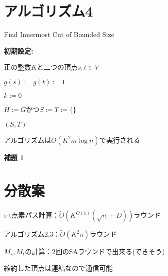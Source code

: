 \documentclass{jarticle}
\theoremstyle{definition}
\newtheorem{lemma}{補題}
\begin{document}
\section*{アルゴリズム4}

\begin{algorithm}[H]
    \caption{Find Innermost Cut of Bounded Size}
    \textbf{初期設定:} \par
    正の整数$K$と二つの頂点$s,t\in V$ \par
    $g(s):= g(t) := 1$ \par
    $k:=0$ \par
    $H:=G$かつ$S:=T:=\{\}$ \par
    {\setlength{\baselineskip}{10pt}
    \begin{algorithmic}[1]
         
         
         
        \Else 
        \EndIf

        \Else 
        \EndIf

        \Else 
             
             
        \EndIf
    \EndWhile {}
     $(S,T)$
    \end{algorithmic}
    }
\end{algorithm}

アルゴリズムは$O(K^2m\log n)$で実行される

\begin{lemma}
    
\end{lemma}

\section*{分散案}
s-t点素パス計算：$\tilde{O}(K^{O(1)}(\sqrt{n} + D))$ラウンド \par
アルゴリズム2,3：$\tilde{O}(K^2n)$ラウンド \par
$M_s,M_t$の計算：2回のSAラウンドで出来る(できそう)\par
縮約した頂点は連結なので通信可能
\end{document}
